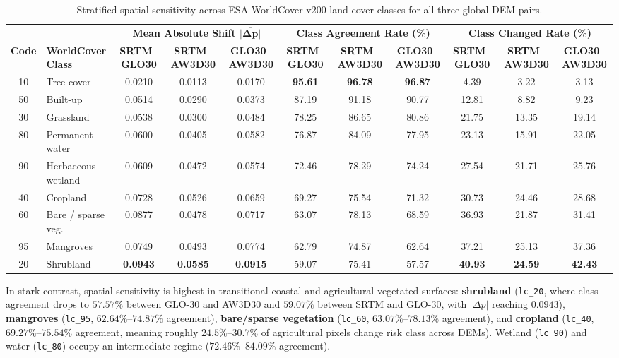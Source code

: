 \documentclass[11pt,twoside]{article}
\begin{document}
\begin{table}[!htbp]
\small
\centering
\caption{Stratified spatial sensitivity across ESA WorldCover v200 land-cover classes for all three global DEM pairs.}
\label{tab:worldcover-sensitivity}
\begin{adjustbox}{max width=\textwidth}
\begin{tabular}{cl ccc ccc ccc}
\toprule
& & \multicolumn{3}{c}{\textbf{Mean Absolute Shift $\boldsymbol{\overline{|\Delta p|}}$}} & \multicolumn{3}{c}{\textbf{Class Agreement Rate (\%)}} & \multicolumn{3}{c}{\textbf{Class Changed Rate (\%)}} \\
\cmidrule(lr){3-5} \cmidrule(lr){6-8} \cmidrule(lr){9-11}
\textbf{Code} & \textbf{WorldCover Class} & \textbf{SRTM--GLO30} & \textbf{SRTM--AW3D30} & \textbf{GLO30--AW3D30} & \textbf{SRTM--GLO30} & \textbf{SRTM--AW3D30} & \textbf{GLO30--AW3D30} & \textbf{SRTM--GLO30} & \textbf{SRTM--AW3D30} & \textbf{GLO30--AW3D30} \\
\midrule
10 & Tree cover & 0.0210 & 0.0113 & 0.0170 & \textbf{95.61} & \textbf{96.78} & \textbf{96.87} & 4.39 & 3.22 & 3.13 \\
50 & Built-up & 0.0514 & 0.0290 & 0.0373 & 87.19 & 91.18 & 90.77 & 12.81 & 8.82 & 9.23 \\
30 & Grassland & 0.0538 & 0.0300 & 0.0484 & 78.25 & 86.65 & 80.86 & 21.75 & 13.35 & 19.14 \\
80 & Permanent water & 0.0600 & 0.0405 & 0.0582 & 76.87 & 84.09 & 77.95 & 23.13 & 15.91 & 22.05 \\
90 & Herbaceous wetland & 0.0609 & 0.0472 & 0.0574 & 72.46 & 78.29 & 74.24 & 27.54 & 21.71 & 25.76 \\
40 & Cropland & 0.0728 & 0.0526 & 0.0659 & 69.27 & 75.54 & 71.32 & 30.73 & 24.46 & 28.68 \\
60 & Bare / sparse veg.\ & 0.0877 & 0.0478 & 0.0717 & 63.07 & 78.13 & 68.59 & 36.93 & 21.87 & 31.41 \\
95 & Mangroves & 0.0749 & 0.0493 & 0.0774 & 62.79 & 74.87 & 62.64 & 37.21 & 25.13 & 37.36 \\
20 & Shrubland & \textbf{0.0943} & \textbf{0.0585} & \textbf{0.0915} & 59.07 & 75.41 & 57.57 & \textbf{40.93} & \textbf{24.59} & \textbf{42.43} \\
\bottomrule
\end{tabular}
\end{adjustbox}
\end{table}

In stark contrast, spatial sensitivity is highest in transitional coastal and agricultural vegetated surfaces: \textbf{shrubland} (\texttt{lc\_20}, where class agreement drops to $57.57\%$ between GLO-30 and AW3D30 and $59.07\%$ between SRTM and GLO-30, with $\overline{|\Delta p|}$ reaching $0.0943$), \textbf{mangroves} (\texttt{lc\_95}, $62.64\%\text{--}74.87\%$ agreement), \textbf{bare/sparse vegetation} (\texttt{lc\_60}, $63.07\%\text{--}78.13\%$ agreement), and \textbf{cropland} (\texttt{lc\_40}, $69.27\%\text{--}75.54\%$ agreement, meaning roughly $24.5\%\text{--}30.7\%$ of agricultural pixels change risk class across DEMs). Wetland (\texttt{lc\_90}) and water (\texttt{lc\_80}) occupy an intermediate regime ($72.46\%\text{--}84.09\%$ agreement).
\end{document}
